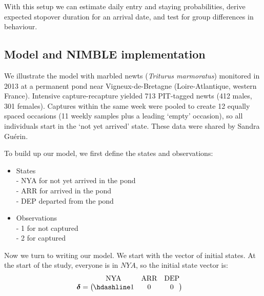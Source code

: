 \documentclass[
  12pt,
]{krantz}
\begin{document}
With this setup we can estimate daily entry and staying probabilities, derive expected stopover duration for an arrival date, and test for group differences in behaviour.

\subsection{Model and NIMBLE implementation}\label{model-and-nimble-implementation-8}

We illustrate the model with marbled newts (\emph{Triturus marmoratus}) monitored in 2013 at a permanent pond near Vigneux-de-Bretagne (Loire-Atlantique, western France). Intensive capture-recapture yielded 713 PIT-tagged newts (412 males, 301 females). Captures within the same week were pooled to create 12 equally spaced occasions (11 weekly samples plus a leading `empty' occasion), so all individuals start in the `not yet arrived' state. These data were shared by Sandra Guérin.

To build up our model, we first define the states and observations:

\begin{itemize}
\item
  States\\
  - NYA for not yet arrived in the pond\\
  - ARR for arrived in the pond\\
  - DEP departed from the pond
\item
  Observations\\
  - 1 for not captured\\
  - 2 for captured
\end{itemize}

Now we turn to writing our model. We start with the vector of initial states. At the start of the study, everyone is in \(NYA\), so the initial state vector is:
\[
\begin{matrix}
& \\
\boldsymbol{\delta} =
\left ( \vphantom{ \begin{matrix} 1 \end{matrix} } \right .
\end{matrix}
\hspace{-1.2em}
\begin{matrix}
\text{NYA} & \text{ARR} & \text{DEP} \\ \hdashline
1 & 0 & 0
\end{matrix}
\hspace{-0.2em}
\begin{matrix}
& \\
\left . \vphantom{ \begin{matrix} 1 \end{matrix} } \right )
\end{matrix}
\]
\end{document}
